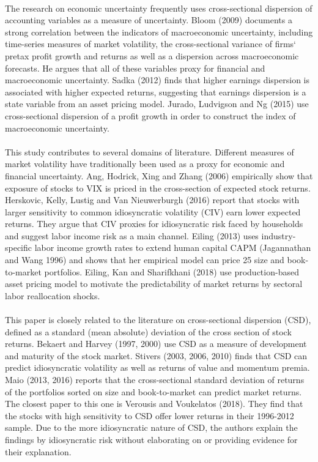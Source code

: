 \documentclass[12pt]{article}
\begin{document}
\paragraph{}
The research on economic uncertainty frequently uses cross-sectional dispersion of accounting variables as a measure of uncertainty. Bloom (2009) documents a strong correlation between the indicators of macroeconomic uncertainty, including time-series measures of market volatility, the cross-sectional variance of firms` pretax profit growth and returns as well as a dispersion across macroeconomic forecasts. He argues that all of these variables proxy for financial and macroeconomic uncertainty. Sadka (2012) finds that higher earnings dispersion is associated with higher expected returns, suggesting that earnings dispersion is a state variable from an asset pricing model. Jurado, Ludvigson and Ng (2015) use cross-sectional dispersion of a profit growth in order to construct the index of macroeconomic uncertainty.
\paragraph{}
This study contributes to several domains of literature. Different measures of market volatility have traditionally been used as a proxy for economic and financial uncertainty. Ang, Hodrick, Xing and Zhang (2006) empirically show that exposure of stocks to VIX is priced in the cross-section of expected stock returns. Herskovic, Kelly, Lustig and Van Nieuwerburgh (2016) report that stocks with larger sensitivity to common idiosyncratic volatility (CIV) earn lower expected returns. They argue that CIV proxies for idiosyncratic risk faced by households and suggest labor income risk as a main channel. Eiling (2013) uses industry-specific labor income growth rates to extend human capital CAPM (Jagannathan and Wang 1996) and shows that her empirical model can price 25 size and book-to-market portfolios. Eiling, Kan and Sharifkhani (2018) use production-based asset pricing model to motivate the predictability of market returns by sectoral labor reallocation shocks. 
\paragraph{}
This paper is closely related to the literature on cross-sectional dispersion (CSD), defined as a standard (mean absolute) deviation of the cross section of stock returns. Bekaert and Harvey (1997, 2000) use CSD as a measure of development and maturity of the stock market. Stivers (2003, 2006, 2010) finds that CSD can predict idiosyncratic volatility as well as returns of value and momentum premia. Maio (2013, 2016) reports that the cross-sectional standard deviation of returns of the portfolios sorted on size and book-to-market can predict market returns. The closest paper to this one is Verousis and Voukelatos (2018). They find that the stocks with high sensitivity to CSD offer lower returns in their 1996-2012 sample. Due to the more idiosyncratic nature of CSD, the authors explain the findings by idiosyncratic risk without elaborating on or providing evidence for their explanation.
\end{document}
